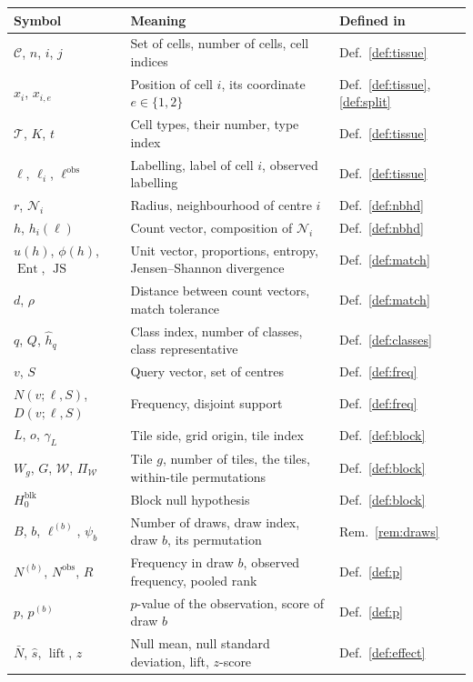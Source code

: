 \documentclass[11pt,a4paper]{article}
\theoremstyle{remark}
\newcommand{\cells}{\mathcal{C}}
\newcommand{\types}{\mathcal{T}}
\newcommand{\lab}{\ell}
\newcommand{\obs}{\mathrm{obs}}
\newcommand{\Nb}[1]{\mathcal{N}_{#1}}
\newcommand{\tiles}{\mathcal{W}}
\newcommand{\lift}{\operatorname{lift}}
\newcommand{\JS}{\operatorname{JS}}
\begin{document}
\begin{small}
\begin{longtable}{lp{8.2cm}l}
\toprule
Symbol & Meaning & Defined in \\
\midrule
\endhead
\bottomrule
\endfoot
$\cells$, $n$, $i$, $j$ & Set of cells, number of cells, cell indices & Def.~\ref{def:tissue} \\
$x_i$, $x_{i,e}$ & Position of cell $i$, its coordinate $e\in\{1,2\}$ & Def.~\ref{def:tissue}, \ref{def:split} \\
$\types$, $K$, $t$ & Cell types, their number, type index & Def.~\ref{def:tissue} \\
$\lab$, $\lab_i$, $\lab^{\obs}$ & Labelling, label of cell $i$, observed labelling & Def.~\ref{def:tissue} \\
$r$, $\Nb{i}$ & Radius, neighbourhood of centre $i$ & Def.~\ref{def:nbhd} \\
$h$, $h_i(\lab)$ & Count vector, composition of $\Nb{i}$ & Def.~\ref{def:nbhd} \\
$u(h)$, $\phi(h)$, $\operatorname{Ent}$, $\JS$ & Unit vector, proportions, entropy, Jensen--Shannon divergence & Def.~\ref{def:match} \\
$d$, $\rho$ & Distance between count vectors, match tolerance & Def.~\ref{def:match} \\
$q$, $Q$, $\hat h_q$ & Class index, number of classes, class representative & Def.~\ref{def:classes} \\
$v$, $S$ & Query vector, set of centres & Def.~\ref{def:freq} \\
$N(v;\lab,S)$, $D(v;\lab,S)$ & Frequency, disjoint support & Def.~\ref{def:freq} \\
$L$, $o$, $\gamma_L$ & Tile side, grid origin, tile index & Def.~\ref{def:block} \\
$W_g$, $G$, $\tiles$, $\Pi_{\tiles}$ & Tile $g$, number of tiles, the tiles, within-tile permutations & Def.~\ref{def:block} \\
$H_0^{\mathrm{blk}}$ & Block null hypothesis & Def.~\ref{def:block} \\
$B$, $b$, $\lab^{(b)}$, $\psi_b$ & Number of draws, draw index, draw $b$, its permutation & Rem.~\ref{rem:draws} \\
$N^{(b)}$, $N^{\obs}$, $R$ & Frequency in draw $b$, observed frequency, pooled rank & Def.~\ref{def:p} \\
$p$, $p^{(b)}$ & $p$-value of the observation, score of draw $b$ & Def.~\ref{def:p} \\
$\bar N$, $\hat s$, $\lift$, $z$ & Null mean, null standard deviation, lift, $z$-score & Def.~\ref{def:effect} \\

\end{longtable}
\end{small}
\end{document}
